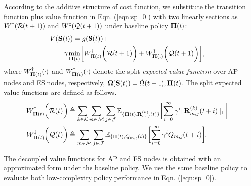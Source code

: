According to the additive structure of cost function, we substitute the transition function plus value function in Eqn. (\ref{eqn:sp_0}) with two linearly sections as $W^{\dagger}(\mathcal{R}(t+1))$ and $W^{\ddagger}(\mathcal{Q}(t+1))$ under baseline policy $\boldsymbol{\Pi}(t)$:
\begin{align}
    &V(\Stat(t)) = g(\Stat(t)) +
    \nonumber\\
    &~~~~~~\gamma \min_{\BaseLine(t)} \Bracket{ W^{\AP}_{\BaseLine(t)}\Paren{\mathcal{R}(t+1)} + W^{\ES}_{\BaseLine(t)}\Paren{\mathcal{Q}(t+1)} },
\end{align}
where $W^{\dagger}_{\boldsymbol{\Pi}(t)}(\cdot)$ and $W^{\ddagger}_{\boldsymbol{\Pi}(t)}(\cdot)$ denote the split \emph{expected value function} over AP nodes and ES nodes, respectively, $\boldsymbol{\Omega}(\mathbf{S}(t)) = \tilde{\Omega}(t-1), \boldsymbol{\Pi}(t)$. The split expected value functions are defined as follows.
\begin{align}
    W^{\AP}_{\BaseLine(t)}\Paren{\mathcal{R}(t)}
        &\define \sum_{k\in\apSet}\sum_{m\in\esSet}\sum_{j\in\jSpace}
        \mathbb{E}_{\{\BaseLine(t), \vec{R}^{(k)}_{m,j}(t)\}}\Bracket{
            \sum_{i=0}^{\infty} \gamma^{i} \Inorm{\vec{R}^{(k)}_{m,j}({t+i})}
        }
    \\
    W^{\ES}_{\BaseLine(t)}\Paren{\mathcal{Q}(t)}
        &\define \sum_{m\in\esSet}\sum_{j\in\jSpace}
        \mathbb{E}_{\{\BaseLine(t), Q_{m,j}(t)\}}\Bracket{
            \sum_{i=0}^{\infty} \gamma^{i} Q_{m,j}({t+i})
        }.
\end{align}
        
The decoupled value functions for AP and ES nodes is obtained with an approximated form under the baseline policy. We use the same baseline policy to evaluate both low-complexity policy performance in Eqn. (\ref{eqn:sp_0}).

